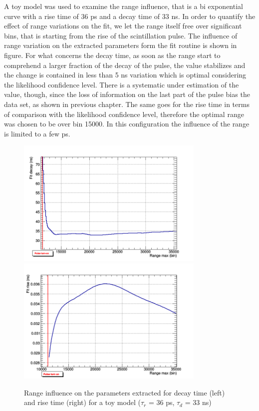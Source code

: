 A toy model was used to examine the range influence, that is a bi exponential curve with a rise time of 36 ps and a decay time of 33 ns. 
In order to quantify the effect of range variations on the fit, we let the range itself free over significant bins, that is starting from the rise of the scintillation pulse.
The influence of range variation on the extracted parameters form the fit routine is shown in figure.
For what concerns the decay time, as soon as the range start to comprehend a larger fraction of the decay of the pulse, the value stabilizes and the change is contained in less than 5 ns variation which is optimal considering the likelihood confidence level. There is a systematic under estimation of the value, though, since the loss of information on the last part of the pulse bias the data set, as shown in previous chapter.
The same goes for the rise time in terms of comparison with the likelihood confidence level, therefore the optimal range was chosen to be over bin 15000. In this configuration the influence of the range is limited to a few ps.
\begin{figure}[htbp]
\begin{center}
\includegraphics[width=9cm]{../Pictures/Chapter_7/decay_range_2.png}
\includegraphics[width=9cm]{../Pictures/Chapter_7/rise_range_2.png}
\end{center}
\caption[Range influence on toy model parameters]{Range influence on the parameters extracted for decay time (left) and rise time (right) for a toy model ($\tau _{r}$ = 36 ps, $\tau _{d}$ = 33 ns)}
\label{fig:range}
\end{figure}

